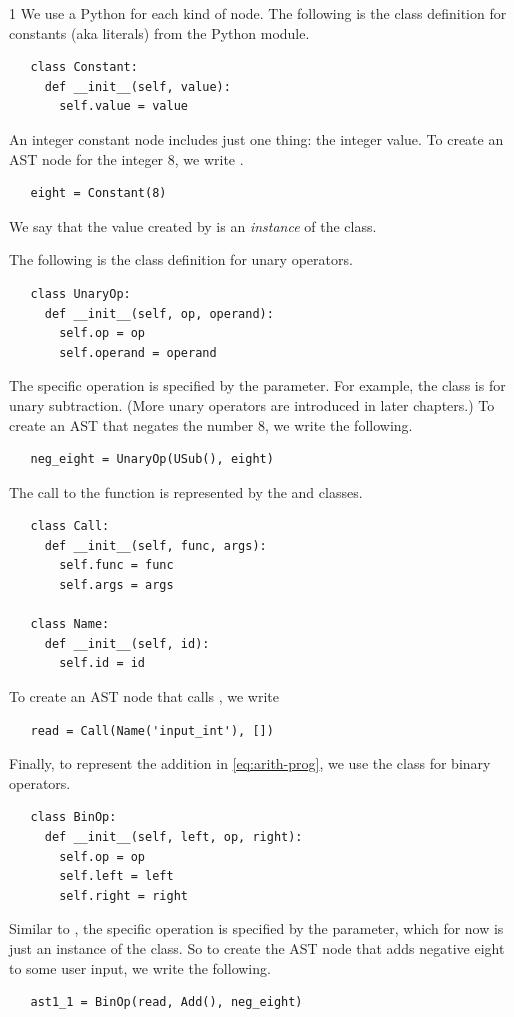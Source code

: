 \documentclass[7x10]{TimesAPriori_MIT}%
\def\pythonEd{1}
\def\edition{1}
\newcommand{\pythonColor}[0]{}
\numberwithin{theorem}{chapter}
\numberwithin{definition}{chapter}
\numberwithin{equation}{chapter}
\begin{document}
{\if\edition\pythonEd\pythonColor
We use a Python  for each kind of node.
The following is the class definition for
constants (aka literals)
from the Python  module.
\begin{lstlisting}
   class Constant:
     def __init__(self, value):
       self.value = value
\end{lstlisting}
An integer constant node includes just one thing: the integer value.
To create an AST node for the integer $8$, we write .
\begin{lstlisting}
   eight = Constant(8)
\end{lstlisting}
We say that the value created by  is an
\emph{instance} of the  class.

The following is the class definition for unary operators.
\begin{lstlisting}
   class UnaryOp:
     def __init__(self, op, operand):
       self.op = op
       self.operand = operand
\end{lstlisting}
The specific operation is specified by the  parameter.  For
example, the class  is for unary subtraction.
(More unary operators are introduced in later chapters.) To create an AST that
negates the number $8$, we write the following.
\begin{lstlisting}
   neg_eight = UnaryOp(USub(), eight)
\end{lstlisting}

The call to the  function is represented by the
 and  classes.
\begin{lstlisting}
   class Call:
     def __init__(self, func, args):
       self.func = func
       self.args = args

   class Name:
     def __init__(self, id):        
       self.id = id
\end{lstlisting}
To create an AST node that calls , we write
\begin{lstlisting}
   read = Call(Name('input_int'), [])
\end{lstlisting}

Finally, to represent the addition in \eqref{eq:arith-prog}, we use
the  class for binary operators.
\begin{lstlisting}
   class BinOp:
     def __init__(self, left, op, right):
       self.op = op
       self.left = left
       self.right = right
\end{lstlisting}
Similar to , the specific operation is specified by the
 parameter, which for now is just an instance of the
 class. So to create the AST
node that adds negative eight to some user input, we write the following.
\begin{lstlisting}
   ast1_1 = BinOp(read, Add(), neg_eight)
\end{lstlisting}
\fi}
\end{document}
